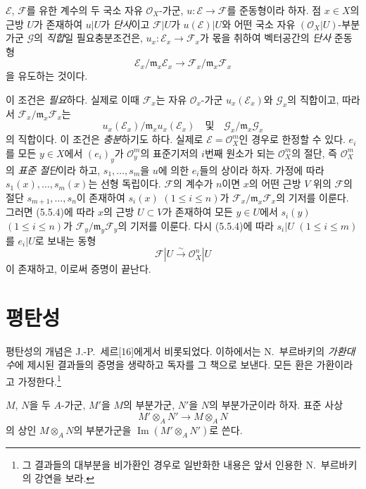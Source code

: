 \begin{env}[5.5.5]
\label{0.5.5.5-ko}
$\mathcal E$, $\mathcal F$를 유한 계수의 두 국소 자유
$\mathcal O_X$-가군, $u:\mathcal E\to\mathcal F$를 준동형이라 하자.
점 $x\in X$의 근방 $U$가 존재하여 $u|U$가 \emph{단사}이고
$\mathcal F|U$가 $u(\mathcal E)|U$와 어떤 국소 자유
$(\mathcal O_X|U)$-부분가군 $\mathcal G$의 \emph{직합}일
필요충분조건은, $u_x:\mathcal E_x\to\mathcal F_x$가 몫을 취하여
벡터공간의 \emph{단사} 준동형
\[
  \mathcal E_x/\mathfrak m_x\mathcal E_x
  \longrightarrow
  \mathcal F_x/\mathfrak m_x\mathcal F_x
\]
을 유도하는 것이다.

이 조건은 \emph{필요}하다. 실제로 이때 $\mathcal F_x$는 자유
$\mathcal O_x$-가군 $u_x(\mathcal E_x)$와 $\mathcal G_x$의 직합이고,
따라서 $\mathcal F_x/\mathfrak m_x\mathcal F_x$는
\[
  u_x(\mathcal E_x)/\mathfrak m_xu_x(\mathcal E_x)
  \quad\text{및}\quad
  \mathcal G_x/\mathfrak m_x\mathcal G_x
\]
의 직합이다. 이 조건은 \emph{충분}하기도 하다. 실제로
$\mathcal E=\mathcal O_X^m$인 경우로 한정할 수 있다.
$e_i$를 모든 $y\in X$에서 $(e_i)_y$가 $\mathcal O_y^m$의 표준기저의
$i$번째 원소가 되는 $\mathcal O_X^m$의 절단, 즉
$\mathcal O_X^m$의 \emph{표준 절단}이라 하고,
$s_1,\ldots,s_m$을 $u$에 의한 $e_i$들의 상이라 하자. 가정에 따라
$s_1(x),\ldots,s_m(x)$는 선형 독립이다. $\mathcal F$의 계수가
$n$이면 $x$의 어떤 근방 $V$ 위의 $\mathcal F$의 절단
$s_{m+1},\ldots,s_n$이 존재하여 $s_i(x)$ $(1\leq i\leq n)$가
$\mathcal F_x/\mathfrak m_x\mathcal F_x$의 기저를 이룬다. 그러면
(5.5.4)에 따라 $x$의 근방 $U\subset V$가 존재하여 모든 $y\in U$에서
$s_i(y)$ $(1\leq i\leq n)$가
$\mathcal F_y/\mathfrak m_y\mathcal F_y$의 기저를 이룬다. 다시
(5.5.4)에 따라 $s_i|U$ $(1\leq i\leq m)$를 $e_i|U$로 보내는 동형
\[
  \mathcal F|U\xrightarrow{\sim}\mathcal O_X^n|U
\]
이 존재하고, 이로써 증명이 끝난다.
\end{env}

\section{평탄성}
\label{section:0.6-ko}

\begin{env}[6.0]
\label{0.6.0.0-ko}
평탄성의 개념은 J.-P.~세르[16]에게서 비롯되었다. 이하에서는
N.~부르바키의 \emph{가환대수}에 제시된 결과들의 증명을 생략하고
독자를 그 책으로 보낸다. 모든 환은 가환이라고 가정한다.\footnote{그
결과들의 대부분을 비가환인 경우로 일반화한 내용은 앞서 인용한
N.~부르바키의 강연을 보라.}


$M$, $N$을 두 $A$-가군, $M'$을 $M$의 부분가군, $N'$을 $N$의
부분가군이라 하자. 표준 사상
\[
  M'\otimes_A N'\longrightarrow M\otimes_A N
\]
의 상인 $M\otimes_A N$의 부분가군을
$\operatorname{Im}(M'\otimes_A N')$로 쓴다.
\end{env}

